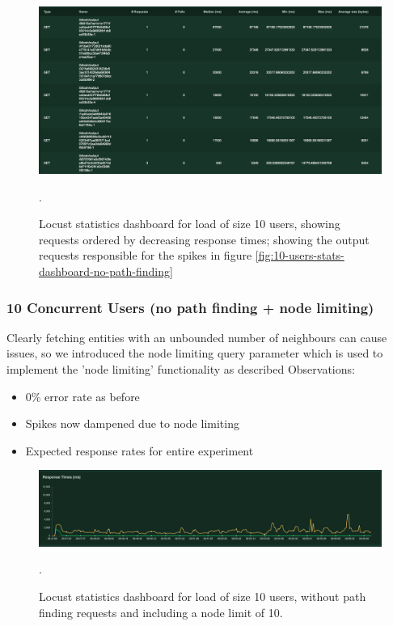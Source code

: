 \begin{figure}[h!]
  \centering
  \includegraphics[width = 15cm]{./figures/10-users-no-path-culprit}\\[0.5cm]
  \caption{Locust statistics dashboard for load of size 10 users, showing requests ordered by decreasing response times; showing the output requests responsible for the spikes in figure \ref{fig:10-users-stats-dashboard-no-path-finding}}.
  \label{fig:10-users-slow-outputs}
\end{figure}

\subsubsection{10 Concurrent Users (no path finding + node limiting)}
Clearly fetching entities with an unbounded number of neighbours can cause issues, so we introduced the node limiting query parameter which is used to implement the 'node limiting' functionality as described
Observations:
\begin{itemize}
    \item 0\% error rate as before 
    \item Spikes now dampened due to node limiting
    \item Expected response rates for entire experiment 
\end{itemize}

\begin{figure}[h!]
  \centering
  \includegraphics[width = 15cm]{./figures/10-users-no-path-with-limit}\\[0.5cm]
  \caption{Locust statistics dashboard for load of size 10 users, without path finding requests and including a node limit of 10.}.
  \label{fig:10-users-no-path-with-limit}
\end{figure}

